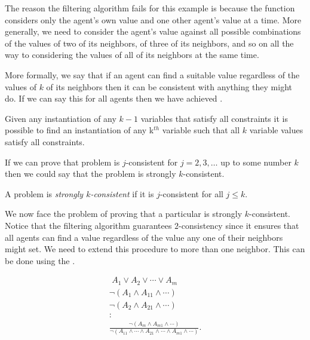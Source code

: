 The reason the filtering algorithm fails for this example is because
the  function considers only the agent's own value and
one other agent's value at a time. More generally, we need to consider
the agent's value against all possible combinations of the values of
two of its neighbors, of three of its neighbors, and so on all the way
to considering the values of all of its neighbors at the same time.

More formally, we say that if an agent can find a suitable value
regardless of the values of $k$ of its neighbors then it can be
consistent with anything they might do. If we can say this for all
agents then we have achieved .

\begin{definition}[$k$-consistency]
  Given any instantiation of any $k-1$ variables that satisfy all
  constraints it is possible to find an instantiation of any
  k$^{th}$ variable such that all $k$ variable values satisfy all
  constraints.
\end{definition}

If we can prove that problem is $j$-consistent for $j=2,3,\ldots$ up
to some number $k$ then we could say that the problem is strongly
$k$-consistent.

\begin{definition}
  A problem is \emph{strongly $k$-consistent} if it is
  $j$-consistent for all $j \leq k$.
\end{definition}

We now face the problem of proving that a particular  is
strongly $k$-consistent. Notice that the filtering algorithm
guarantees $2$-consistency since it ensures that all agents can find a
value regardless of the value any one of their neighbors might set. We
need to extend this procedure to more than one neighbor. This can be
done using the .

\begin{definition}
  \begin{gather*}
    \,\,A_1 \vee A_2 \vee \cdots \vee A_m \\
    \neg (A_1 \wedge A_{11} \wedge \cdots) \\
    \neg (A_2 \wedge A_{21} \wedge \cdots)\\
    :\\
    \frac{\neg (A_m \wedge A_{m1} \wedge \cdots)}{\neg (A_{11} \wedge \cdots \wedge A_{21} \wedge \cdots \wedge A_{m1} \wedge \cdots )}.
  \end{gather*}
\end{definition}

